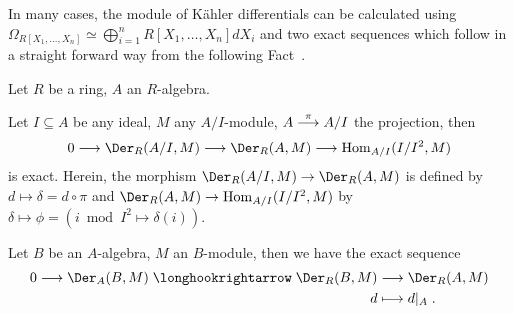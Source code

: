 \documentclass[a4paper,parskip=half,numbers=enddot, DIV=12, headheight=30pt]{scrreprt}
\begin{document}
In many cases, the module of Kähler differentials can be calculated using $\Omega_{R[X_1,\ldots,X_n]}\simeq \bigoplus_{i=1}^n R[X_1,\ldots, X_n] dX_i$ and two exact sequences which follow in a straight forward way from the following Fact~.
\begin{fact}
    Let $R$ be a ring, $A$ an $R$-algebra.
    \begin{alphanumerate}
        \item 
            Let $I\subseteq A$ be any ideal, $M$ any $A/I$-module, $A\morphism[\pi]A/I$ the projection, then 
            \begin{align}\lbl{eq:derExactSequence1}
                0\morphism \Der_R(A/I,M) \morphism \Der_R(A,M) \morphism \Hom_{A/I}(I/I^2, M) 
            \end{align}
            is exact. Herein, the morphism $\Der_R(A/I,M) \morphism \Der_R(A,M)$ is defined by $d\mapsto \delta=d\circ\pi$ and $\Der_R(A,M) \morphism \Hom_{A/I}(I/I^2, M)$ by $\delta\mapsto\phi = \left(i\bmod I^2\mapsto\delta(i)\right)$.
        \item 
            Let $B$ be an $A$-algebra, $M$ an $B$-module, then we have the exact sequence
            \begin{align}\lbl{eq:derExactSequence2}
	            \begin{split}
		            0 \morphism \Der_A(B,M) \monomorphism\Der_R(B,M) &\morphism \Der_R(A,M)\\
		            d&\longmapsto d|_A\;.
	            \end{split}
            \end{align}
    \end{alphanumerate}
\end{fact}
\end{document}
